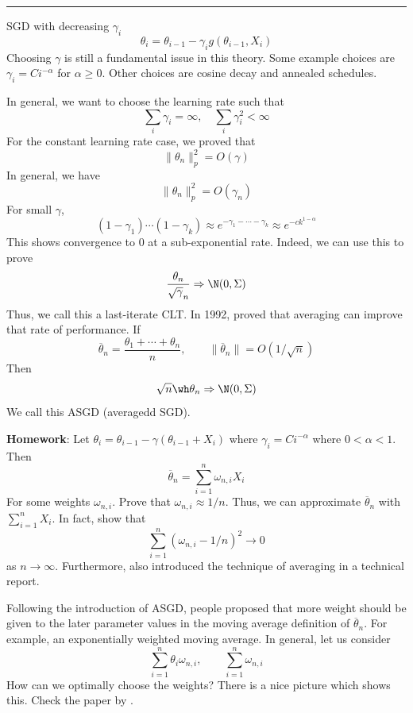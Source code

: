 \begin{center}\rule{0.5\linewidth}{0.5pt}\end{center}

SGD with decreasing \(\gamma_i\)
\[\theta_i = \theta_{i-1} - \gamma_i g(\theta_{i-1}, X_i)\]
Choosing \(\gamma\) is still a fundamental issue in this theory. Some example choices are \(\gamma_i = C i^{-\alpha}\) for \(\alpha \geq 0\). Other choices are cosine decay and annealed schedules.

In general, we want to choose the learning rate such that
\[\sum_i \gamma_i = \infty, \quad \sum_i \gamma_i^2 < \infty\]
For the constant learning rate case, we proved that
\[\|\theta_n\|_p^2 = O(\gamma)\]
In general, we have
\[\|\theta_n\|_p^2 = O(\gamma_n)\]
For small \(\gamma\),
\[(1 - \gamma_1) \cdots (1 - \gamma_k) \approx e^{-\gamma_1 - \cdots - \gamma_k} \approx e^{-c k^{1 - \alpha}}\]
This shows convergence to \(0\) at a sub-exponential rate. Indeed, we can use this to prove
\[\frac{\theta_n}{\sqrt \gamma_n} \Rightarrow \N(0, \Sigma)\]
Thus, we call this a last-iterate CLT. In 1992, \citet{PJ92} proved that averaging can improve that rate of performance. If
\[\overline \theta_n = \frac{\theta_1 + \cdots + \theta_n}{n}, \qquad \|\overline \theta_n\| = O(1/\sqrt n)\]
Then
\[\sqrt n \wh \theta_n \Rightarrow \N(0, \Sigma)\]
We call this ASGD (averagedd SGD).

\textbf{Homework}: Let \(\theta_i = \theta_{i-1} - \gamma (\theta_{i-1} + X_i)\) where \(\gamma_i = C i^{-\alpha}\) where \(0 < \alpha < 1\). Then
\[\overline \theta_n = \sum_{i=1}^n \omega_{n,i} X_i\]
For some weights \(\omega_{n,i}\). Prove that \(\omega_{n,i} \approx 1/n\). Thus, we can approximate \(\overline \theta_n\) with \(\sum_{i=1}^n X_i\). In fact, show that
\[\sum_{i=1}^n (\omega_{n,i} - 1/n)^2 \to 0\]
as \(n \to \infty\). Furthermore, \citet{Rup88} also introduced the technique of averaging in a technical report.

Following the introduction of ASGD, people proposed that more weight should be given to the later parameter values in the moving average definition of \(\overline \theta_n\). For example, an exponentially weighted moving average. In general, let us consider
\[\sum_{i=1}^n \theta_i \omega_{n,i}, \qquad \sum_{i=1}^n \omega_{n,i}\]
How can we optimally choose the weights? There is a nice picture which shows this. Check the paper by \citet{WZW26}.

